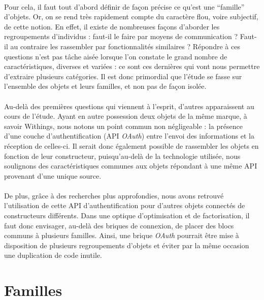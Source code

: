 \documentclass[nocopyrightspace]{sigplanconf}
\begin{document}
	\paragraph{}
	Pour cela, il faut tout d’abord définir de façon précise ce qu’est une “famille” d’objets. Or, on se rend très rapidement compte du caractère flou, voire subjectif, de cette notion. En effet, il existe de nombreuses façons d’aborder les regroupements d’individus : faut-il le faire par moyens de communication ? Faut-il au contraire les rassembler par fonctionnalités similaires ? Répondre à ces questions n’est pas tâche aisée lorsque l’on constate le grand nombre de caractéristiques, diverses et variées : ce sont ces dernières qui vont nous permettre d’extraire plusieurs catégories. Il est donc primordial que l’étude se fasse sur l’ensemble des objets et leurs familles, et non pas de façon isolée.

	\paragraph{}
	Au-delà des premières questions qui viennent à l’esprit, d’autres apparaissent au cours de l’étude. Ayant en autre possession deux objets de la même marque, à savoir Withings, nous notons un point commun non négligeable : la présence d’une couche d’authentification (API \textit{OAuth}) entre l’envoi des informations et la réception de celles-ci. Il serait donc également possible de rassembler les objets en fonction de leur constructeur, puisqu’au-delà de la technologie utilisée, nous soulignons des caractéristiques communes aux objets répondant à une même API provenant d’une unique source.

	\paragraph{}
	De plus, grâce à des recherches plus approfondies, nous avons retrouvé l’utilisation de cette API d’authentification pour d’autres objets connectés de constructeurs différents. Dans une optique d’optimisation et de factorisation, il faut donc envisager, au-delà des briques de connexion, de placer des blocs communs à plusieurs familles. Ainsi, une brique \textit{OAuth} pourrait être mise à disposition de plusieurs regroupements d’objets et éviter par la même occasion une duplication de code inutile.

\section{Familles}
\end{document}
